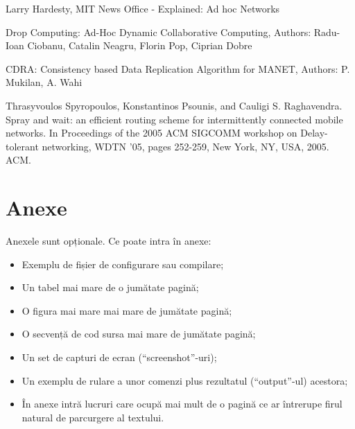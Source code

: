 \documentclass[12pt,a4paper]{report}
\begin{document}
\begin{thebibliography}{Bibliografie}

Larry Hardesty, MIT News Office - Explained: Ad hoc Networks

Drop Computing: Ad-Hoc Dynamic Collaborative Computing, Authors: Radu-Ioan Ciobanu, Catalin Neagru, Florin Pop, Ciprian Dobre

CDRA: Consistency based Data Replication Algorithm for MANET, Authors: P. Mukilan, A. Wahi

Thrasyvoulos Spyropoulos, Konstantinos Psounis, and Cauligi S. Raghavendra. Spray
and wait: an efficient routing scheme for intermittently connected mobile networks. In
Proceedings of the 2005 ACM SIGCOMM workshop on Delay-tolerant networking, WDTN
'05, pages 252-259, New York, NY, USA, 2005. ACM.

\end{thebibliography}


\newpage

\chapter{Anexe}

Anexele sunt opționale.
Ce poate intra în anexe:
\begin{itemize}
\item	Exemplu de fișier de configurare sau compilare;
\item	Un tabel mai mare de o jumătate pagină;
\item	O figura mai mare mai mare de jumătate pagină;
\item	O secvență de cod sursa mai mare de jumătate pagină;
\item	Un set de capturi de ecran (``screenshot''-uri);
\item	Un exemplu de rulare a unor comenzi plus rezultatul (``output''-ul) acestora;
\item 	În anexe intră lucruri care ocupă mai mult de o pagină ce ar întrerupe firul natural de parcurgere al textului.
\end{itemize}
\end{document}
